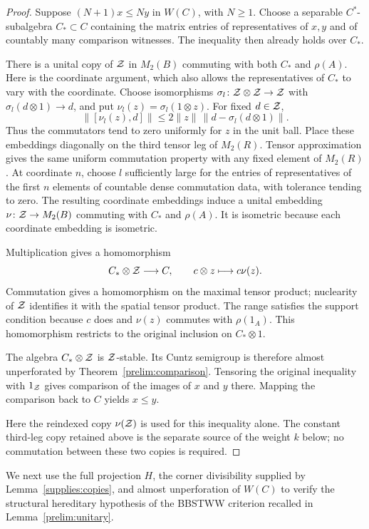 \begin{proof}
Suppose $(N+1)x\leq Ny$ in $W(C)$, with $N\geq1$.
Choose a separable $C^*$-subalgebra $C_*\subset C$ containing the
matrix entries of representatives of $x,y$ and of countably many
comparison witnesses.  The inequality then already holds over
$C_*$.

There is a unital copy of $\mathcal Z$ in $M_2(B)$ commuting with both
$C_*$ and $\rho(A)$.  Here is the coordinate argument, which also
allows the representatives of $C_*$ to vary with the coordinate.
Choose isomorphisms
$\sigma_l\colon\mathcal Z\otimes\mathcal Z\to\mathcal Z$ with
$\sigma_l(d\otimes1)\to d$, and put
$\nu_l(z)=\sigma_l(1\otimes z)$.  For fixed $d\in\mathcal Z$,
\[
 \|[\nu_l(z),d]\|
 \leq 2\|z\|\,\|d-\sigma_l(d\otimes1)\|.
\]
Thus the commutators tend to zero uniformly for $z$ in the unit
ball.  Place these embeddings diagonally on the third tensor leg
of $M_2(R)$.  Tensor approximation gives the same uniform
commutation property with any fixed element of $M_2(R)$.
At coordinate $n$, choose $l$ sufficiently large for the entries
of representatives of the first $n$ elements of countable dense
commutation data, with tolerance tending to zero.  The resulting
coordinate embeddings induce a unital embedding
$\nu\colon\mathcal Z\to M_2(B)$ commuting with $C_*$ and $\rho(A)$.
It is isometric because each coordinate embedding is isometric.

Multiplication gives a homomorphism
\[
 C_*\otimes\mathcal Z\longrightarrow C,\qquad c\otimes z\longmapsto c\nu(z).
\]
Commutation gives a homomorphism on the maximal tensor product;
nuclearity of $\mathcal Z$ identifies it with the spatial tensor product.
The range satisfies the support condition because $c$ does and
$\nu(z)$ commutes with $\rho(1_A)$.  This homomorphism restricts
to the original inclusion on $C_*\otimes1$.

The algebra $C_*\otimes\mathcal Z$ is $\mathcal Z$-stable.  Its Cuntz semigroup
is therefore almost unperforated by Theorem~\ref{prelim:comparison}.  Tensoring the original inequality with
$1_\mathcal Z$ gives comparison of the images of $x$ and $y$ there.
Mapping the comparison back to $C$ yields $x\leq y$.

Here the reindexed copy $\nu(\mathcal Z)$ is used for this inequality alone.
The constant third-leg copy retained above is the separate source of
the weight $k$ below; no commutation between these two copies is
required.
\end{proof}

We next use the full projection $H$, the corner divisibility supplied
by Lemma~\ref{supplies:copies}, and almost unperforation of $W(C)$
to verify the structural hereditary hypothesis of the BBSTWW
criterion recalled in Lemma~\ref{prelim:unitary}.

